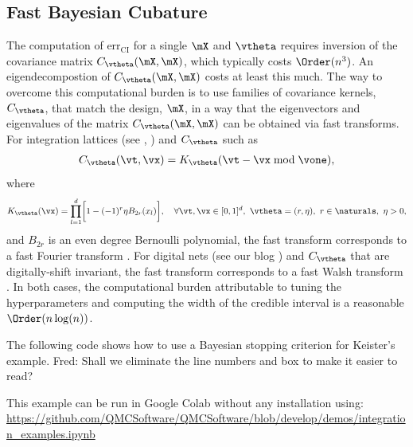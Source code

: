 \subsection*{Fast Bayesian Cubature}
The computation of $\text{err}_{\text{CI}}$ for a single $\mX$ and $\vtheta$ requires inversion of the covariance matrix $ C_{\vtheta}(\mX,\mX)$, which typically costs $\Order(n^3)$.  An eigendecompostion of  $ C_{\vtheta}(\mX,\mX)$ costs at least this much.  The way to overcome this computational burden is to use families of covariance kernels, $C_\vtheta$, that match the design, $\mX$, in a way that the eigenvectors and eigenvalues of the matrix $C_{\vtheta}(\mX,\mX)$ can be obtained via fast transforms. For integration lattices (see \cite{SloJoe94}, \cite{HicNie03a}) and $C_\vtheta$ such as 
\begin{align*}
C_\vtheta(\vt,\vx) = K_\vtheta(\vt - \vx \bmod \vone),
\end{align*}
where
\begin{align*}
\label{the_kernel_eqn_bernoulli}
K_\vtheta(\vx) =
\prod_{l=1}^d \biggl[
1 - (-1)^{r} \eta B_{2r}( x_l) \biggr], \quad
\forall \vt,\vx \in [0,1]^d, \  \vtheta = (r,\eta), \ r \in \naturals, \ \eta > 0,
\end{align*}
and $B_{2r}$ is an even degree Bernoulli polynomial,
the fast transform corresponds to a fast Fourier transform \cite{RatHic19a,cooley65}.  For digital nets (see our blog \cite{Ebertblogdigitalnet2021}) and $C_\vtheta$ that are digitally-shift invariant, the fast transform corresponds to a fast Walsh transform \cite{Jag19a,fino76}.  In both cases, the computational burden attributable to tuning the hyperparameters and computing the width of the credible interval is a reasonable $\Order(n \log(n))$.


The following code shows how to use a Bayesian stopping criterion for Keister's example.  {\color{red} Fred: Shall we eliminate the line numbers and box to make it easier to read?}

This example can be run in Google Colab without any installation using: \url{https://github.com/QMCSoftware/QMCSoftware/blob/develop/demos/integration_examples.ipynb}

\iffalse 










